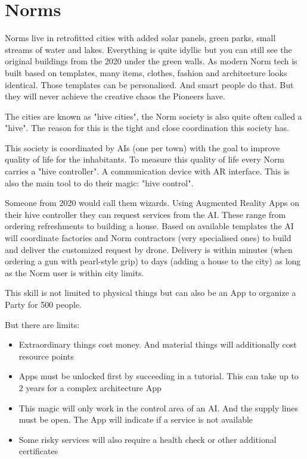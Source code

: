 \section{Norms}

Norms live in retrofitted cities with added solar panels, green parks, small streams of water and lakes. Everything is quite idyllic but you can still see the original buildings from the 2020 under the green walls.
As modern Norm tech is built based on templates, many items, clothes, fashion and architecture looks identical. Those templates can be personalised. And smart people do that. But they will never achieve the creative chaos the Pioneers have.

The cities are known as "hive cities", the Norm society is also quite often called a "hive". The reason for this is the tight and close coordination this society has.

This society is coordinated by AIs (one per town) with the goal to improve quality of life for the inhabitants.
To measure this quality of life every Norm carries a "hive controller". A communication device with AR interface. This is also the main tool to do their magic: "hive control".

Someone from 2020 would call them wizards. Using Augmented Reality Apps on their hive controller they can request services from the AI. These range from ordering refreshments to building a house. 
Based on available templates the AI will coordinate factories and Norm contractors (very specialised ones) to build and deliver the customized request by drone.
Delivery is within minutes (when ordering a gun with pearl-style grip) to days (adding a house to the city) as long as the Norm user is within city limits.

This skill is not limited to physical things but can also be an App to organize a Party for 500 people.

But there are limits:

\begin{itemize}
    \item Extraordinary things cost money. And material things will additionally cost resource points
    \item Apps must be unlocked first by succeeding in a tutorial. This can take up to 2 years for a complex architecture App
    \item This magic will only work in the control area of an AI. And the supply lines must be open. The App will indicate if a service is not available
    \item Some risky services will also require a health check or other additional certificates    
\end{itemize}

